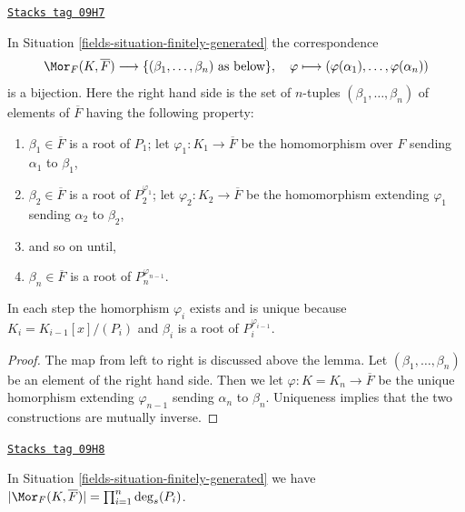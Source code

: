 \begin{lemma}
\label{fields-lemma-count-embeddings}
\href{https://stacks.math.columbia.edu/tag/09H7}{\texttt{Stacks tag 09H7}}

In Situation \ref{fields-situation-finitely-generated} the correspondence
$$
\Mor_F(K, \overline{F})
\longrightarrow
\{(\beta_1, \ldots, \beta_n)\text{ as below}\},
\quad
\varphi \longmapsto (\varphi(\alpha_1), \ldots, \varphi(\alpha_n))
$$
is a bijection. Here the right hand side is the set of $n$-tuples
$(\beta_1, \ldots, \beta_n)$ of elements of $\overline{F}$ having
the following property:
\begin{enumerate}
\item $\beta_1 \in \overline{F}$ is a root of $P_1$;
let $\varphi_1 : K_1 \to \overline{F}$ be the homomorphism
over $F$ sending $\alpha_1$ to $\beta_1$,
\item $\beta_2 \in \overline{F}$ is a root of $P_2^{\varphi_1}$;
let $\varphi_2 : K_2 \to \overline{F}$ be the homomorphism
extending $\varphi_1$ sending $\alpha_2$ to $\beta_2$,
\item and so on until,
\item $\beta_n \in \overline{F}$ is a root of $P_n^{\varphi_{n - 1}}$.
\end{enumerate}
In each step the homorphism $\varphi_i$ exists and is unique because
$K_i = K_{i - 1}[x]/(P_i)$ and $\beta_i$ is a root of $P_i^{\varphi_{i - 1}}$.
\end{lemma}

\begin{proof}
The map from left to right is discussed above the lemma.
Let $(\beta_1, \ldots, \beta_n)$ be an element of the right hand side.
Then we let $\varphi : K = K_n \to \overline{F}$ be the unique homorphism
extending $\varphi_{n - 1}$ sending $\alpha_n$ to $\beta_n$.
Uniqueness implies that the two constructions are mutually inverse.
\end{proof}

\begin{lemma}
\label{fields-lemma-count-embeddings-explicitly}
\href{https://stacks.math.columbia.edu/tag/09H8}{\texttt{Stacks tag 09H8}}

In Situation \ref{fields-situation-finitely-generated} we have
$|\Mor_F(K, \overline{F})| = \prod_{i = 1}^n \deg_s(P_i)$.
\end{lemma}

